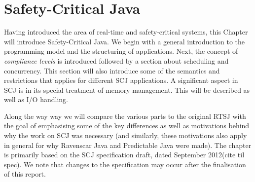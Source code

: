 \chapter{Safety-Critical Java}
\label{chapter:scj}
Having introduced the area of real-time and safety-critical systems, this Chapter will introduce Safety-Critical Java. We begin with a general introduction to the programming model and the structuring of applications. Next, the concept of \textit{compliance levels} is introduced followed by a section about scheduling and concurrency. This section will also introduce some of the semantics and restrictions that applies for different SCJ applications. A significant aspect in SCJ is in its special treatment of memory management. This will be described as well as I/O handling.

Along the way way we will compare the various parts to the original RTSJ with the goal of emphasising some of the key differences as well as motivations behind why the work on SCJ was necessary (and similarly, these motivations also apply in general for why Ravenscar Java and Predictable Java were made). The chapter is primarily based on the SCJ specification draft, dated September 2012(cite til spec). We note that changes to the specification may occur after the finalisation of this report.
